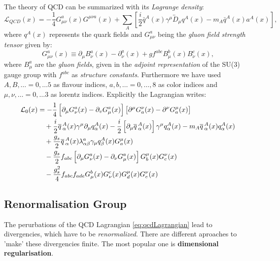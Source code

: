 \documentclass[../../index.tex]{subfiles}
\begin{document}
The theory of QCD can be summarized with its \textit{Lagrange
  density}\cite{Jamin2006}:
\begin{equation}
  \label{eq:qcdLagrangian}
  \mathcal{L}_{QCD}(x) = -\frac{1}{4}G_{\mu\nu}^a(x)G^{\mu\nu a}(x) + \sum_A \left[ \frac{i}{2} \bar{q}^A(x) \gamma^\mu \overleftrightarrow{D}_\mu q^A(x) - m_A\bar{q}^A(x) a^A(x) \right],
\end{equation}
where $q^A(x)$ represents the quark fields and $G_{\mu\nu}^a$ being the
\textit{gluon field strength tensor} given by:
\begin{equation}
  \label{eq:gluonField}
  G_{\mu\nu}^a(x) \equiv \partial_\mu B_\nu^a(x) - \partial_\nu^a(x) + g f^{abc} B_\mu^b(x) B_\nu^c(x),
\end{equation}
where $B_\mu^a$ are the \textit{gluon fields}, given in the \textit{adjoint
  representation} of the SU(3) gauge group with $f^{abc}$ as \textit{structure
  constants}. Furthermore we have used $A, B, \dotsc = 0, \dotsc 5$ as flavour
indices, $a, b, \dotsc = 0, \dotsc, 8 $ as color indices and $\mu, \nu, \dotsc =
0, \dotsc 3$ as lorentz indices. Explicitly the Lagrangian writes:
\begin{equation}
  \begin{split}
    \mathcal{L}_0(x) &=- \frac{1}{4} \left[ \partial_\mu G_\nu^a(x) - \partial_v G_\mu^a(x) \right] \left[ \partial^\mu G_a^\nu(x) - \partial^\nu G^\mu_a(x) \right] \\
    &\quad+ \frac{i}{2}\overline{q}\,_\alpha^A(x) \gamma^\mu \partial_\mu q_\alpha^A(x) - \frac{i}{2} \left[ \partial_\mu \overline{q}\,_\alpha^A(x) \right] \gamma^\mu q_\alpha^A(x) - m_A \overline{q}\,_\alpha^A(x) q_\alpha^A(x) \\
    &\quad+ \frac{g_s}{2} \overline{q}\,_\alpha^A(x) \lambda^a_{\alpha \beta}\gamma_\mu q_\beta^A(x) G^\mu_a(x) \\
    &\quad- \frac{g_s}{2}f_{abc}\left[ \partial_\mu G_\nu^a(x) - \partial_\nu G_\mu^a(x)\right] G_b^\mu(x) G_c^\nu(x) \\
    &\quad- \frac{g_s^2}{4} f_{abc}f_{ade} G_\mu^b(x) G_\nu^c(x) G_d^\mu(x) G_e^\nu(x)
  \end{split}
\end{equation}


\subsection{Renormalisation Group}
The perurbations of the QCD Lagrangian \ref{eq:qcdLagrangian} lead to
divergencies, which have to be \textit{renormalized}. There are different
aproaches to 'make' these divergencies finite. The most popular one is
\textbf{dimensional regularisation}.
\end{document}
